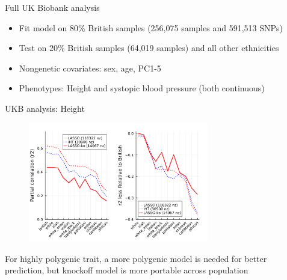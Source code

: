 \documentclass[aspectratio=169, 10pt]{beamer}
\begin{document}

\begin{frame}{Full UK Biobank analysis}
\begin{itemize}
    \item Fit model on 80\% British samples (256,075 samples and 591,513 SNPs)
    \item Test on 20\% British samples (64,019 samples) and all other ethnicities
    \item Nongenetic covariates: sex, age, PC1-5
    \item Phenotypes: Height and systopic blood pressure (both continuous)
\end{itemize}
\end{frame}

\begin{frame}{UKB analysis: Height}
    \begin{figure}
        \centering
        \includegraphics[width=0.7\textwidth]{figures/ukb_height.png}
    \end{figure}
    For highly polygenic trait, a more polygenic model is needed for better prediction, but knockoff model is more portable across population
\end{frame}
\end{document}
